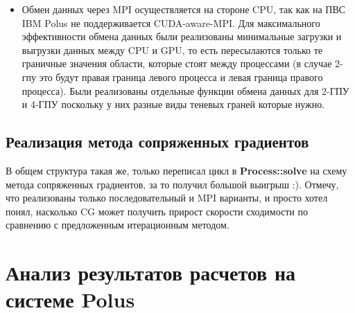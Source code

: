 \documentclass{article}
\begin{document}
\begin{itemize}
    \item Обмен данных через MPI осуществляется на стороне CPU, так как на ПВС IBM Polus не поддерживается CUDA-aware-MPI. Для максимального эффективности обмена данных были реализованы минимальные загрузки и выгрузки данных между CPU и GPU, то есть пересылаются только те граничные значения области, которые стоят между процессами (в случае 2-гпу это будут правая граница левого процесса и левая граница правого процесса). Были реализованы отдельные функции обмена данных для 2-ГПУ и 4-ГПУ поскольку у них разные виды теневых граней которые нужно.  
\end{itemize}

\subsection{Реализация метода сопряженных градиентов}
В общем структура такая же, только переписал цикл в \textbf{Process::solve} на схему метода сопряженных градиентов, за то получил большой выигрыш :). Отмечу, что реализованы только последовательный и MPI варианты, и просто хотел понял, насколько CG может получить прирост скорости сходимости по сравнению с предложенным итерационным методом.

\section{Анализ результатов расчетов на системе Polus}
\end{document}
